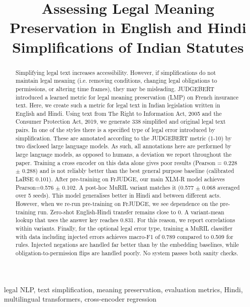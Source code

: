 \documentclass[conference]{IEEEtran}
\begin{document}
\title{Assessing Legal Meaning Preservation in English and Hindi Simplifications of Indian Statutes}
\author{}
\maketitle
\begin{abstract}
Simplifying legal text increases accessibility. However, if simplifications do not maintain legal meaning (i.e. removing conditions, changing legal obligations to permissions, or altering time frames), they may be misleading. JUDGEBERT introduced a learned metric for legal meaning preservation (LMP) on French insurance text. Here, we create such a metric for legal text in Indian legislation written in English and Hindi. Using text from The Right to Information Act, 2005 and the Consumer Protection Act, 2019, we generate 338 simplified and original legal text pairs. In one of the styles there is a specified type of legal error introduced by simplification. These are annotated according to the JUDGEBERT metric (1-10) by two disclosed large language models. As such, all annotations here are performed by large language models, as opposed to humans, a deviation we report throughout the paper. Training a cross encoder on this data alone gives poor results (Pearson = 0.228 \ensuremath{\pm} 0.288) and is not reliably better than the best general purpose baseline (calibrated LaBSE 0.101). After pre-training on FrJUDGE, our main XLM-R model achieves Pearson=0.576 \ensuremath{\pm} 0.102. A post-hoc MuRIL variant matches it (0.577 \ensuremath{\pm} 0.068 averaged over 5 seeds). This model generalises better in Hindi and between different acts. However, when we re-run pre-training on FrJUDGE, we see dependence on the pre-training run. Zero-shot English-Hindi transfer remains close to 0. A variant-mean lookup that uses the answer key reaches 0.831. For this reason, we report correlations within variants. Finally, for the optional legal error type, training a MuRIL classifier with data including injected errors achieves macro-F1 of 0.789 compared to 0.509 for rules. Injected negations are handled far better than by the embedding baselines, while obligation-to-permission flips are handled poorly. No system passes both sanity checks.
\end{abstract}
\begin{IEEEkeywords}
legal NLP, text simplification, meaning preservation, evaluation metrics, Hindi, multilingual transformers, cross-encoder regression
\end{IEEEkeywords}
\end{document}
